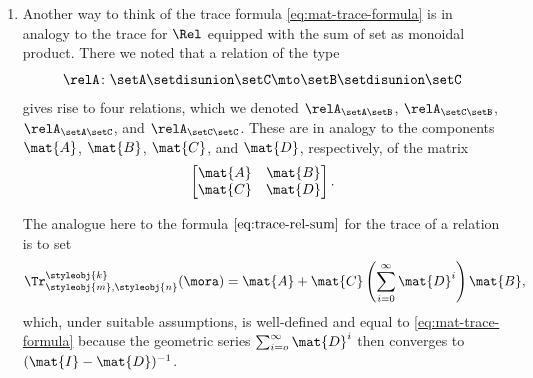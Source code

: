 \begin{remark}
\begin{enumerate}
              \begin{equation}\label{eq:mat-fixpoint-output-equation}
                  \mat{y} = \mat{A} \mat{u} + \mat{C}\mat{x}
              \end{equation}
              where $\mat{x}$ is required to satisfy the recursive equation
              \begin{equation}
                  \mat{x} = \mat{B}\mat{u} + \mat{D} \mat{x}
              \end{equation}
              which, if $\mat{I} - \mat{D}$ is invertible, may be solved thus:
              \begin{equation}
                  \mat{x} = (\mat{I} - \mat{D})^{-1}\mat{B}\mat{u}.
              \end{equation}
              Substituting this formula in \cref{eq:mat-fixpoint-output-equation}, we obtain
              \begin{equation}
                  \mat{y} = \mat{A}\mat{u} + \mat{C}(\mat{I} - \mat{D})^{-1}\mat{B}\mat{u}
              \end{equation}
        \item
              Another way to think of the trace formula \cref{eq:mat-trace-formula} is in analogy to the trace for $\Rel$ equipped with the sum of set as monoidal product.
              There we noted that a relation of the type
              \begin{equation}
                  \relA \colon \setA \setdisunion \setC \mto \setB \setdisunion \setC
              \end{equation}
              gives rise to four relations, which we denoted $\relA_{\setA \setB}$, $\relA_{\setC \setB}$, $\relA_{\setA \setC}$, and $\relA_{\setC \setC}$.
              These are in analogy to the components $\mat{A}$, $\mat{B}$, $\mat{C}$, and $\mat{D}$, respectively, of the matrix
              \begin{equation}
                  \begin{bmatrix}
                      \mat{A} & \mat{B} \\
                      \mat{C} & \mat{D}
                  \end{bmatrix}.
              \end{equation}

              The analogue here to the formula $\cref{eq:trace-rel-sum}$ for the trace of a relation is to set
              \begin{equation}
                  \Tr_{\styleobj{m},\styleobj{n}}^\styleobj{k} (\mora) = \mat{A} + \mat{C} \left( \sum_{i=0}^\infty \mat{D}^i \right) \mat{B},
              \end{equation}
              which, under suitable assumptions, is well-defined and equal to \cref{eq:mat-trace-formula} because the geometric series $\sum_{i=o}^\infty \mat{D}^i$ then converges to $(\mat{I} - \mat{D})^{-1}$.
    \end{enumerate}
\end{remark}

